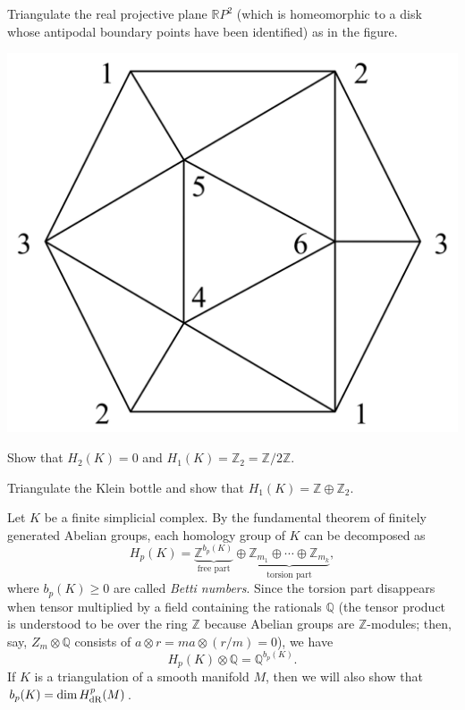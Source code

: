 \documentclass[english,letterpaper]{article}%
\numberwithin{equation}{section}
\numberwithin{figure}{section}
\numberwithin{table}{section}
\theoremstyle{definition}
\theoremstyle{definition}
\theoremstyle{definition}
\theoremstyle{plain}
\theoremstyle{plain}
\theoremstyle{plain}
\theoremstyle{plain}
\theoremstyle{remark}
\theoremstyle{remark}
\newcommand{\bbR}{\mathbb{R}}
\newcommand{\bbZ}{\mathbb{Z}}
\newcommand{\bbQ}{\mathbb{Q}}
\renewcommand{\geq}{\geqslant}
\begin{document}
\begin{xca}
    Triangulate the real projective plane $\bbR P^2$ (which is homeomorphic to a disk whose antipodal boundary points have been identified) as in the figure.
    \begin{center}
        \includegraphics[scale=0.2]{Images/projectiveplane.png}
    \end{center}
    Show that $H_2(K)=0$ and $H_1(K)=\bbZ_2=\bbZ/2\bbZ$.
\end{xca}
\begin{xca}
    Triangulate the Klein bottle and show that $H_1(K)=\bbZ\oplus\bbZ_2$.
\end{xca}

\begin{defn}
    Let $K$ be a finite simplicial complex. By the fundamental theorem of finitely generated Abelian groups, each homology group of $K$ can be decomposed as
    \[H_p(K)=\underbrace{\bbZ^{b_p(K)}}_{\text{free part}}\oplus \underbrace{\bbZ_{m_1}\oplus \cdots \oplus \bbZ_{m_k}}_{\text{torsion part}},\]
    where $b_p(K)\geq 0$ are called \emph{Betti numbers}. 
    Since the torsion part disappears when tensor multiplied by a field containing the rationals $\bbQ$ (the tensor product is understood to be over the ring $\bbZ$ because Abelian groups are $\bbZ$-modules; then, say, $Z_m\otimes \bbQ$ consists of $a\otimes r=ma\otimes (r/m)=0$), we have
    \[H_p(K)\otimes \bbQ=\bbQ^{b_p(K)}.\]
    If $K$ is a triangulation of a smooth manifold $M$, then we will also show that $b_p(K)=\dim H_{\rm dR}^p(M)$.
\end{defn}
\end{document}
